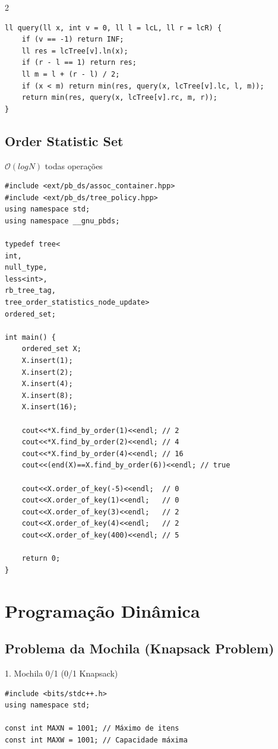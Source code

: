 \documentclass[11pt]{article}
\begin{document}
\begin{multicols}{2}
\begin{lstlisting}
ll query(ll x, int v = 0, ll l = lcL, ll r = lcR) {
    if (v == -1) return INF;
    ll res = lcTree[v].ln(x);
    if (r - l == 1) return res;
    ll m = l + (r - l) / 2;
    if (x < m) return min(res, query(x, lcTree[v].lc, l, m));
    return min(res, query(x, lcTree[v].rc, m, r));
}
\end{lstlisting}


\subsection{Order Statistic Set}
$\mathcal{O}(logN)$ todas operações

\begin{lstlisting}
#include <ext/pb_ds/assoc_container.hpp>
#include <ext/pb_ds/tree_policy.hpp>
using namespace std;
using namespace __gnu_pbds;

typedef tree<
int,
null_type,
less<int>,
rb_tree_tag,
tree_order_statistics_node_update>
ordered_set;

int main() {
    ordered_set X;
    X.insert(1);
    X.insert(2);
    X.insert(4);
    X.insert(8);
    X.insert(16);

    cout<<*X.find_by_order(1)<<endl; // 2
    cout<<*X.find_by_order(2)<<endl; // 4
    cout<<*X.find_by_order(4)<<endl; // 16
    cout<<(end(X)==X.find_by_order(6))<<endl; // true

    cout<<X.order_of_key(-5)<<endl;  // 0
    cout<<X.order_of_key(1)<<endl;   // 0
    cout<<X.order_of_key(3)<<endl;   // 2
    cout<<X.order_of_key(4)<<endl;   // 2
    cout<<X.order_of_key(400)<<endl; // 5
    
    return 0;
}

\end{lstlisting}

\section{Programação Dinâmica}

\subsection{Problema da Mochila (Knapsack Problem)}

1. Mochila 0/1 (0/1 Knapsack)
\begin{lstlisting}
#include <bits/stdc++.h>
using namespace std;

const int MAXN = 1001; // Máximo de itens
const int MAXW = 1001; // Capacidade máxima


\end{lstlisting}
\end{multicols}
\end{document}
